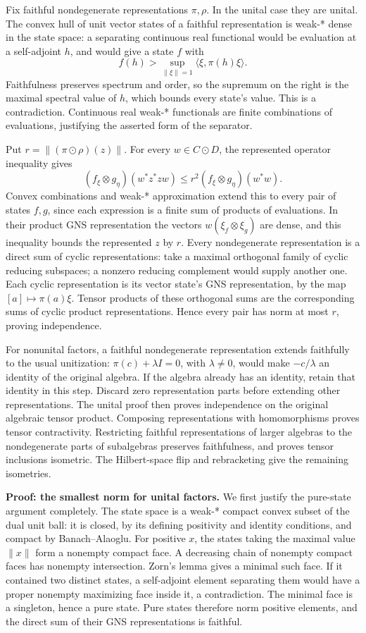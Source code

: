 \documentclass[
  11pt,
]{article}
\newcounter{none} %
\begin{document}
Fix faithful nondegenerate representations \(\pi,\rho\). In the unital
case they are unital. The convex hull of unit vector states of a
faithful representation is weak-* dense in the state space: a separating
continuous real functional would be evaluation at a self-adjoint \(h\),
and would give a state \(f\) with \[
f(h)>\sup_{\|\xi\|=1}\langle\xi,\pi(h)\xi\rangle.
\] Faithfulness preserves spectrum and order, so the supremum on the
right is the maximal spectral value of \(h\), which bounds every state's
value. This is a contradiction. Continuous real weak-* functionals are
finite combinations of evaluations, justifying the asserted form of the
separator.

Put \(r=\|(\pi\odot\rho)(z)\|\). For every \(w\in C\odot D\), the
represented operator inequality gives \[
(f_\xi\otimes g_\eta)(w^*z^*zw)
\leq r^2(f_\xi\otimes g_\eta)(w^*w).
\] Convex combinations and weak-* approximation extend this to every
pair of states \(f,g\), since each expression is a finite sum of
products of evaluations. In their product GNS representation the vectors
\(w(\xi_f\otimes\xi_g)\) are dense, and this inequality bounds the
represented \(z\) by \(r\). Every nondegenerate representation is a
direct sum of cyclic representations: take a maximal orthogonal family
of cyclic reducing subspaces; a nonzero reducing complement would supply
another one. Each cyclic representation is its vector state's GNS
representation, by the map \([a]\mapsto\pi(a)\xi\). Tensor products of
these orthogonal sums are the corresponding sums of cyclic product
representations. Hence every pair has norm at most \(r\), proving
independence.

For nonunital factors, a faithful nondegenerate representation extends
faithfully to the usual unitization: \(\pi(c)+\lambda I=0\), with
\(\lambda\ne0\), would make \(-c/\lambda\) an identity of the original
algebra. If the algebra already has an identity, retain that identity in
this step. Discard zero representation parts before extending other
representations. The unital proof then proves independence on the
original algebraic tensor product. Composing representations with
homomorphisms proves tensor contractivity. Restricting faithful
representations of larger algebras to the nondegenerate parts of
subalgebras preserves faithfulness, and proves tensor inclusions
isometric. The Hilbert-space flip and rebracketing give the remaining
isometries.

\textbf{Proof: the smallest norm for unital factors.} We first justify
the pure-state argument completely. The state space is a weak-* compact
convex subset of the dual unit ball: it is closed, by its defining
positivity and identity conditions, and compact by Banach--Alaoglu. For
positive \(x\), the states taking the maximal value \(\|x\|\) form a
nonempty compact face. A decreasing chain of nonempty compact faces has
nonempty intersection. Zorn's lemma gives a minimal such face. If it
contained two distinct states, a self-adjoint element separating them
would have a proper nonempty maximizing face inside it, a contradiction.
The minimal face is a singleton, hence a pure state. Pure states
therefore norm positive elements, and the direct sum of their GNS
representations is faithful.
\end{document}
